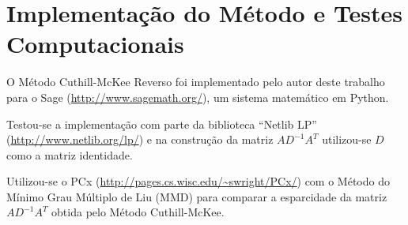 \section{Implementação do Método e Testes Computacionais}
O Método Cuthill-McKee Reverso foi implementado pelo autor deste trabalho para
o Sage (\url{http://www.sagemath.org/}), um sistema matemático em Python. 

Testou-se a implementação com parte da biblioteca ``Netlib LP''
(\url{http://www.netlib.org/lp/}) e na construção da matriz $A D^{-1} A^T$
utilizou-se $D$ como a matriz identidade.

Utilizou-se o PCx (\url{http://pages.cs.wisc.edu/~swright/PCx/}) com o Método do
Mínimo Grau Múltiplo de Liu (MMD) para comparar a
esparcidade da matriz $A D^{-1} A^T$ obtida pelo Método Cuthill-McKee.
